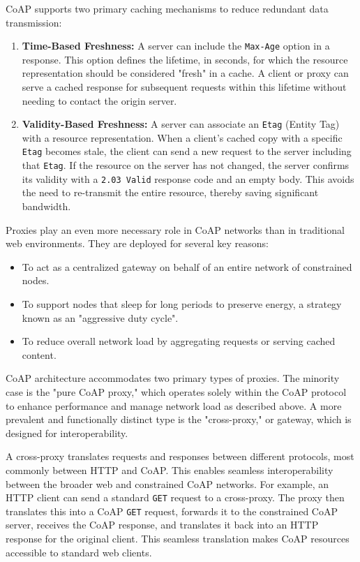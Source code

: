 \documentclass{scrbook}
\begin{document}
CoAP supports two primary caching mechanisms to reduce redundant data transmission:

\begin{enumerate}
    \item \textbf{Time-Based Freshness:} A server can include the \texttt{Max-Age} option in a response. This option defines the lifetime, in seconds, for which the resource representation should be considered "fresh" in a cache. A client or proxy can serve a cached response for subsequent requests within this lifetime without needing to contact the origin server.
    \item \textbf{Validity-Based Freshness:} A server can associate an \texttt{Etag} (Entity Tag) with a resource representation. When a client's cached copy with a specific \texttt{Etag} becomes stale, the client can send a new request to the server including that \texttt{Etag}. If the resource on the server has not changed, the server confirms its validity with a \texttt{2.03 Valid} response code and an empty body. This avoids the need to re-transmit the entire resource, thereby saving significant bandwidth.
\end{enumerate}

Proxies play an even more necessary role in CoAP networks than in traditional web environments. They are deployed for several key reasons:

\begin{itemize}
    \item To act as a centralized gateway on behalf of an entire network of constrained nodes.
    \item To support nodes that sleep for long periods to preserve energy, a strategy known as an "aggressive duty cycle".
    \item To reduce overall network load by aggregating requests or serving cached content.
\end{itemize}

CoAP architecture accommodates two primary types of proxies. The minority case is the "pure CoAP proxy," which operates solely within the CoAP protocol to enhance performance and manage network load as described above. A more prevalent and functionally distinct type is the "cross-proxy," or gateway, which is designed for interoperability.

A cross-proxy translates requests and responses between different protocols, most commonly between HTTP and CoAP. This enables seamless interoperability between the broader web and constrained CoAP networks. For example, an HTTP client can send a standard \texttt{GET} request to a cross-proxy. The proxy then translates this into a CoAP \texttt{GET} request, forwards it to the constrained CoAP server, receives the CoAP response, and translates it back into an HTTP response for the original client. This seamless translation makes CoAP resources accessible to standard web clients.
\end{document}
